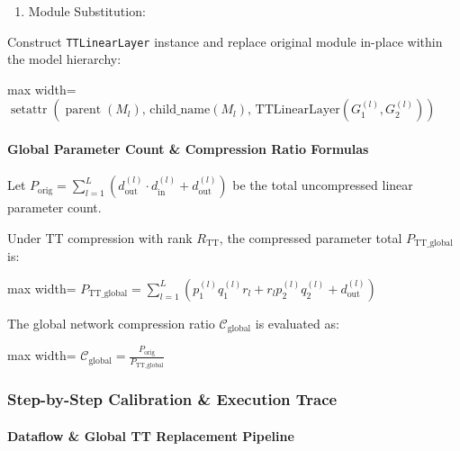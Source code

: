 \begin{enumerate}
\item Module Substitution:
\end{enumerate}
Construct \texttt{TTLinearLayer} instance and replace original module in-place within the model hierarchy:

\begin{center}
\begin{adjustbox}{max width=\columnwidth}
$\displaystyle
\operatorname{setattr}\left(\operatorname{parent}(M_l), \, \text{child\_name}(M_l), \, \text{TTLinearLayer}(G_1^{(l)}, G_2^{(l)})\right)
$
\end{adjustbox}
\end{center}

\paragraph{Global Parameter Count \& Compression Ratio Formulas}
Let $P_{\text{orig}} = \sum_{l=1}^{L} (d_{\text{out}}^{(l)} \cdot d_{\text{in}}^{(l)} + d_{\text{out}}^{(l)})$ be the total uncompressed linear parameter count.

Under TT compression with rank $R_{\text{TT}}$, the compressed parameter total $P_{\text{TT\_global}}$ is:

\begin{center}
\begin{adjustbox}{max width=\columnwidth}
$\displaystyle
P_{\text{TT\_global}} = \sum_{l=1}^{L} \left( p_1^{(l)} q_1^{(l)} r_l + r_l p_2^{(l)} q_2^{(l)} + d_{\text{out}}^{(l)} \right)
$
\end{adjustbox}
\end{center}

The global network compression ratio $\mathcal{C}_{\text{global}}$ is evaluated as:

\begin{center}
\begin{adjustbox}{max width=\columnwidth}
$\displaystyle
\mathcal{C}_{\text{global}} = \frac{P_{\text{orig}}}{P_{\text{TT\_global}}}
$
\end{adjustbox}
\end{center}


\subsubsection*{Step-by-Step Calibration \& Execution Trace}

\paragraph{Dataflow \& Global TT Replacement Pipeline}

